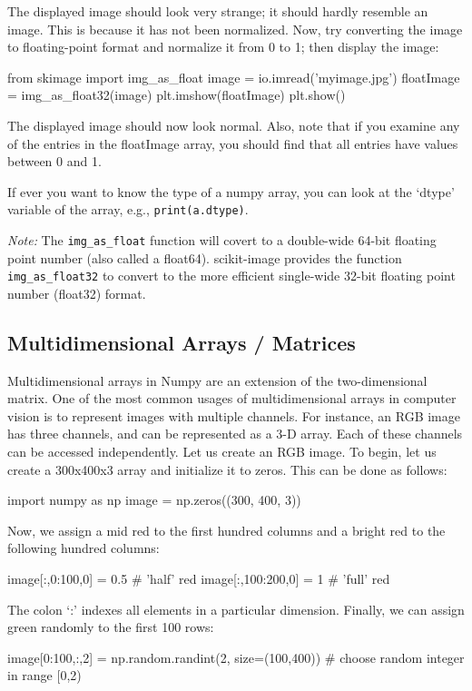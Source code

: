\documentclass{article}
\begin{document}
The displayed image should look very strange; it should hardly resemble an image. This is because it has not been normalized. 
Now, try converting the image to floating-point format and normalize it from 0 to 1; then display the image:
\begin{python}
from skimage import img_as_float
image = io.imread('myimage.jpg')
floatImage = img_as_float32(image)
plt.imshow(floatImage)
plt.show()
\end{python}

The displayed image should now look normal. Also, note that if you examine any of the entries in the floatImage array, you should find that all entries have values between 0 and 1.

If ever you want to know the type of a numpy array, you can look at the `dtype' variable of the array, e.g., \texttt{print(a.dtype)}.

\emph{Note:} The \texttt{img\_as\_float} function will covert to a double-wide 64-bit floating point number (also called a float64). scikit-image provides the function \texttt{img\_as\_float32} to convert to the more efficient single-wide 32-bit floating point number (float32) format.

\subsection{Multidimensional Arrays / Matrices}
Multidimensional arrays in Numpy are an extension of the two-dimensional matrix. One of the most common usages of multidimensional arrays in computer vision is to represent images with multiple channels. For instance, an RGB image has three channels, and can be represented as a 3-D array. Each of these channels can be accessed independently.
Let us create an RGB image. To begin, let us create a 300x400x3 array and initialize it to zeros. This can be done as follows:
\begin{python}
import numpy as np
image = np.zeros((300, 400, 3))
\end{python}

Now, we assign a mid red to the first hundred columns and a bright red to the following hundred columns:
\begin{python}
image[:,0:100,0] = 0.5 # 'half' red
image[:,100:200,0] = 1 # 'full' red
\end{python}

The colon `:' indexes all elements in a particular dimension.
Finally, we can assign green randomly to the first 100 rows:
\begin{python}
image[0:100,:,2] = np.random.randint(2, size=(100,400)) 
# choose random integer in range [0,2)
\end{python}
\end{document}
